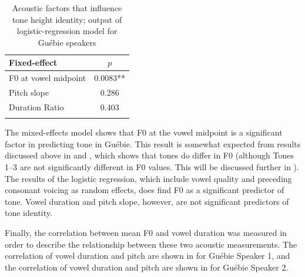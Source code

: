 \documentclass[output=paper]{langscibook}
\begin{document}
\begin{table}
\caption{Acoustic factors that influence tone height identity; output of logistic-regression model for Guébie speakers\label{tab:oakley:GueModel}}
\begin{tabular}{l S[table-format=1.4{**}]}
 \lsptoprule
Fixed-effect  & {$p$} \\ 
 \midrule
F0 at vowel midpoint & 0.0083**  \\
Pitch slope & 0.286  \\ 
Duration Ratio & 0.403 \\ 
\lspbottomrule
\end{tabular}
\end{table}

The mixed-effects model shows that F0 at the vowel midpoint is a significant factor in predicting tone in Guébie. This result is somewhat expected from results discussed above in  and , which shows that tones do differ in F0 (although Tones 1--3 are not significantly different in F0 values. This will be discussed further in ). The results of the logistic regression, which include vowel quality and preceding consonant voicing as random effects, does find F0 as a significant predictor of tone. Vowel duration and pitch slope, however, are not significant predictors of tone identity.

Finally, the correlation between mean F0 and vowel duration was measured in order to describe the relationship between these two acoustic measurements. The correlation of vowel duration and pitch are shown in  for Guébie Speaker 1, and the correlation of vowel duration and pitch are shown in  for Guébie Speaker 2.
\end{document}
